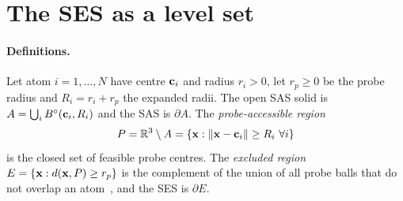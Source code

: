
\section{The SES as a level set}
\label{sec:background}

\paragraph{Definitions.}
Let atom $i = 1,\dots,N$ have centre $\mathbf{c}_i$ and radius $r_i > 0$, let
$r_p \ge 0$ be the probe radius and $R_i = r_i + r_p$ the expanded radii.
The open SAS solid is $A = \bigcup_i B^\circ(\mathbf{c}_i, R_i)$ and the SAS is
$\partial A$. The \emph{probe-accessible region}
\begin{equation}
  P = \mathbb R^3 \setminus A
    = \{\mathbf{x} : \lVert\mathbf{x} - \mathbf{c}_i\rVert \ge R_i \ \forall i\}
\end{equation}
is the closed set of feasible probe centres. The \emph{excluded region}
$E = \{\mathbf{x} : d(\mathbf{x}, P) \ge r_p\}$ is the complement of the union of
all probe balls that do not overlap an atom~\cite{greer1978}, and the SES is
$\partial E$.

